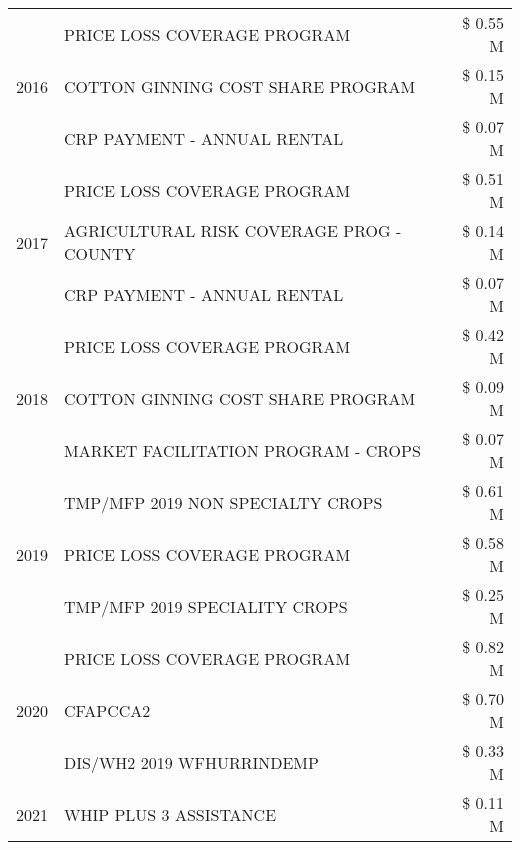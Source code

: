 \begin{tabular}{llr}
\cline{1-3}
\multirow[t]{3}{*}{2016} & PRICE LOSS COVERAGE PROGRAM                   & \$ 0.55 M \\
 & COTTON GINNING COST SHARE PROGRAM             & \$ 0.15 M \\
 & CRP PAYMENT - ANNUAL RENTAL                   & \$ 0.07 M \\
\cline{1-3}
\multirow[t]{3}{*}{2017} & PRICE LOSS COVERAGE PROGRAM & \$ 0.51 M \\
 & AGRICULTURAL RISK COVERAGE PROG - COUNTY & \$ 0.14 M \\
 & CRP PAYMENT - ANNUAL RENTAL & \$ 0.07 M \\
\cline{1-3}
\multirow[t]{3}{*}{2018} & PRICE LOSS COVERAGE PROGRAM & \$ 0.42 M \\
 & COTTON GINNING COST SHARE PROGRAM & \$ 0.09 M \\
 & MARKET FACILITATION PROGRAM - CROPS & \$ 0.07 M \\
\cline{1-3}
\multirow[t]{3}{*}{2019} & TMP/MFP 2019 NON SPECIALTY CROPS & \$ 0.61 M \\
 & PRICE LOSS COVERAGE PROGRAM & \$ 0.58 M \\
 & TMP/MFP 2019 SPECIALITY CROPS & \$ 0.25 M \\
\cline{1-3}
\multirow[t]{3}{*}{2020} & PRICE LOSS COVERAGE PROGRAM & \$ 0.82 M \\
 & CFAPCCA2 & \$ 0.70 M \\
 & DIS/WH2 2019 WFHURRINDEMP & \$ 0.33 M \\
\cline{1-3}
2021 & WHIP PLUS 3 ASSISTANCE & \$ 0.11 M \\
\cline{1-3}
\bottomrule
\end{tabular}
